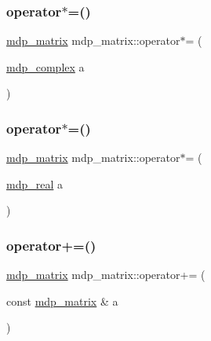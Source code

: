 \mbox{\label{classmdp__matrix_abbab629aca4a06ab60a40087c3ddfe78}} 
\subsubsection{\texorpdfstring{operator$\ast$=()}{operator*=()}\hspace{0.1cm}{\footnotesize\ttfamily [2/3]}}
{\footnotesize\ttfamily \hyperlink{classmdp__matrix}{mdp\+\_\+matrix} mdp\+\_\+matrix\+::operator$\ast$= (\begin{DoxyParamCaption}\item[{\hyperlink{classmdp__complex}{mdp\+\_\+complex}}]{a }\end{DoxyParamCaption})\hspace{0.3cm}{\ttfamily [inline]}}

\mbox{\label{classmdp__matrix_ae933b4a3f23b00dcd22f0fcf4c80379d}} 
\subsubsection{\texorpdfstring{operator$\ast$=()}{operator*=()}\hspace{0.1cm}{\footnotesize\ttfamily [3/3]}}
{\footnotesize\ttfamily \hyperlink{classmdp__matrix}{mdp\+\_\+matrix} mdp\+\_\+matrix\+::operator$\ast$= (\begin{DoxyParamCaption}\item[{\hyperlink{mdp__global__vars_8h_a69d96b74c791e0bbdb888b3913a69450}{mdp\+\_\+real}}]{a }\end{DoxyParamCaption})\hspace{0.3cm}{\ttfamily [inline]}}

\mbox{\label{classmdp__matrix_a44177e84f9b728933675f171ac481a1c}} 
\subsubsection{\texorpdfstring{operator+=()}{operator+=()}\hspace{0.1cm}{\footnotesize\ttfamily [1/3]}}
{\footnotesize\ttfamily \hyperlink{classmdp__matrix}{mdp\+\_\+matrix} mdp\+\_\+matrix\+::operator+= (\begin{DoxyParamCaption}\item[{const \hyperlink{classmdp__matrix}{mdp\+\_\+matrix} \&}]{a }\end{DoxyParamCaption})\hspace{0.3cm}{\ttfamily [inline]}}

